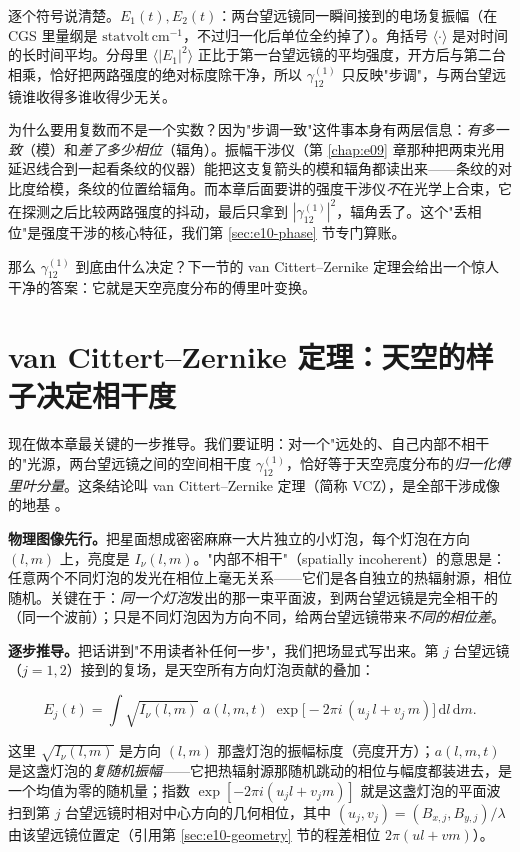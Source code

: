 逐个符号说清楚。\(E_1(t),E_2(t)\)：两台望远镜同一瞬间接到的电场复振幅（在 CGS 里量纲是 \(\mathrm{statvolt\,cm^{-1}}\)，不过归一化后单位全约掉了）。角括号 \(\langle\cdot\rangle\) 是对时间的长时间平均。分母里 \(\langle|E_1|^2\rangle\) 正比于第一台望远镜的平均强度，开方后与第二台相乘，恰好把两路强度的绝对标度除干净，所以 \(\gamma_{12}^{(1)}\) 只反映"步调"，与两台望远镜谁收得多谁收得少无关。

为什么要用复数而不是一个实数？因为"步调一致"这件事本身有两层信息：\emph{有多一致}（模）和\emph{差了多少相位}（辐角）。振幅干涉仪（第 \ref{chap:e09} 章那种把两束光用延迟线合到一起看条纹的仪器）能把这支复箭头的模和辐角都读出来——条纹的对比度给模，条纹的位置给辐角。而本章后面要讲的强度干涉仪\emph{不}在光学上合束，它在探测之后比较两路强度的抖动，最后只拿到 \(|\gamma_{12}^{(1)}|^2\)，辐角丢了。这个"丢相位"是强度干涉的核心特征，我们第 \ref{sec:e10-phase} 节专门算账。

那么 \(\gamma_{12}^{(1)}\) 到底由什么决定？下一节的 van Cittert--Zernike 定理会给出一个惊人干净的答案：它就是天空亮度分布的傅里叶变换。

\section{van Cittert--Zernike 定理：天空的样子决定相干度}
\label{sec:e10-vcz}

现在做本章最关键的一步推导。我们要证明：对一个"远处的、自己内部不相干的"光源，两台望远镜之间的空间相干度 \(\gamma_{12}^{(1)}\)，恰好等于天空亮度分布的\emph{归一化傅里叶分量}。这条结论叫 van Cittert--Zernike 定理（简称 VCZ），是全部干涉成像的地基 \citep{1938Phy.....5..785Z,1939Phy.....6.1129V}。

\textbf{物理图像先行。}把星面想成密密麻麻一大片独立的小灯泡，每个灯泡在方向 \((l,m)\) 上，亮度是 \(I_\nu(l,m)\)。"内部不相干"（spatially incoherent）的意思是：任意两个不同灯泡的发光在相位上毫无关系——它们是各自独立的热辐射源，相位随机。关键在于：\emph{同一个灯泡}发出的那一束平面波，到两台望远镜是完全相干的（同一个波前）；只是不同灯泡因为方向不同，给两台望远镜带来\emph{不同的相位差}。

\textbf{逐步推导。}把话讲到"不用读者补任何一步"，我们把场显式写出来。第 \(j\) 台望远镜（\(j=1,2\)）接到的复场，是天空所有方向灯泡贡献的叠加：

\[
  E_j(t)=\int\sqrt{I_\nu(l,m)}\;a(l,m,t)\;
  \exp\!\big[-2\pi i\,(u_j\,l+v_j\,m)\big]\,\mathrm dl\,\mathrm dm .
\]

这里 \(\sqrt{I_\nu(l,m)}\) 是方向 \((l,m)\) 那盏灯泡的振幅标度（亮度开方）；\(a(l,m,t)\) 是这盏灯泡的\emph{复随机振幅}——它把热辐射源那随机跳动的相位与幅度都装进去，是一个均值为零的随机量；指数 \(\exp[-2\pi i(u_j l+v_j m)]\) 就是这盏灯泡的平面波扫到第 \(j\) 台望远镜时相对中心方向的几何相位，其中 \((u_j,v_j)=(B_{x,j},B_{y,j})/\lambda\) 由该望远镜位置定（引用第 \ref{sec:e10-geometry} 节的程差相位 \(2\pi(ul+vm)\)）。

